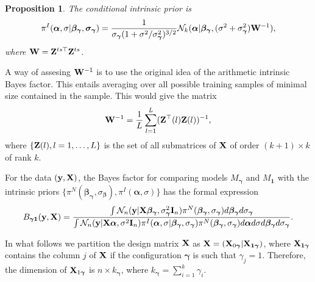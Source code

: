 \documentclass[11pt]{article}
\newcommand{\By}{\mathbf{y}}    \newcommand{\Bz}{\mathbf{z}}
\newcommand{\bfsym}[1]{\ensuremath{\boldsymbol{#1}}}
\def\balpha{\bfsym \alpha}
\def\bbeta{\bfsym \beta}
\def\bgamma{\bfsym \gamma}             \def\bGamma{\bfsym \Gamma}
\def\bsigma{\bfsym \sigma}             \def\bSigma{\bfsym \Sigma}
\theoremstyle{plain}
\newtheorem{proposition}{\quad\quad Proposition}
\theoremstyle{definition}
\theoremstyle{remark}
\begin{document}
\begin{proposition}
The conditional intrinsic prior is
\begin{equation*}
    \begin{split}
    \pi^I (\balpha, \sigma | \bbeta_{\bgamma}, \bsigma_{\bgamma}) 
    =
    \frac{1}{ \sigma_{\bgamma} (1+\sigma^2/\sigma^2_{\bgamma})^{3/2} }
    \mathcal N_k (\balpha | \bbeta_{\bgamma}, (\sigma^2 +\sigma^2_{\bgamma})\BW^{-1}),
    \end{split}
\end{equation*}
where $\mathbf{W}= \mathbf{Z}^{ts\top} \mathbf{Z}^{ts}$.

\end{proposition}
A way of assesing $\mathbf{W}^{-1}$ is to use the original idea of the arithmetic intrinsic Bayes factor.
This entails averaging over all possible training samples of minimal size contained in the sample.
This would give the matrix
\begin{equation*}
    \mathbf{W}^{-1} = \frac{1}{L} \sum_{l=1}^L (\mathbf{Z}^\top (l) \mathbf{Z}(l))^{-1},
\end{equation*}
where $\{\mathbf{Z}(l), l=1,\ldots, L\}$ is the set of all submatrices of $\mathbf{X}$ of order $(k+1)\times k$ of rank $k$.

For the data $(\By, \BX)$, the Bayes factor for comparing models $M_{\bgamma}$ and $M_{\mathbf 1}$ with the intrinsic priors $\{\pi^N (\bbeta_{\bgamma}, \sigma_{\bbeta}), \pi^I (\balpha, \sigma)\}$ has the formal expression
\begin{equation*}
    B_{\bgamma \mathbf 1} (\By, \BX)=
    \frac{
        \int\mathcal N_n (\By | \BX \bbeta_{\bgamma}, \sigma^2_{\bgamma} \BI_n)
        \pi^N (\bbeta_{\bgamma}, \sigma_{\bgamma}) d\bbeta_{\bgamma} d \sigma_{\bgamma}
    }{
        \int\mathcal N_n (\By | \BX \balpha, \sigma^2 \BI_n)
        \pi^I (\balpha, \sigma |\bbeta_{\bgamma} ,\sigma_{\bgamma})
        \pi^N (\bbeta_{\bgamma}, \sigma_{\bgamma}) d\balpha d\sigma d\bbeta_{\bgamma} d \sigma_{\bgamma}
    }.
\end{equation*}


In what follows we partition the design matrix $\mathbf{X}$ as $\BX=(\BX_{0\bgamma}|\BX_{\mathbf 1 \bgamma})$, where $\BX_{\mathbf 1 \bgamma}$ contains the column $j$ of $\mathbf{X}$ if the configuration $\bgamma$ is such that $\gamma_j =1$.
Therefore, the dimension of $\BX_{1\bgamma}$ is $n\times k_{\bgamma}$, where $k_{\bgamma}= \sum_{i=1}^k \gamma_i$.
\end{document}
